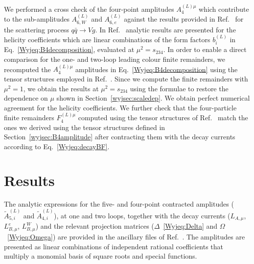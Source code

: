 \documentclass[main.tex]{subfiles}
\begin{document}
We performed a cross check of the four-point amplitudes $A_4^{(L)\mu}$ which contribute to the sub-amplitudes $A^{(L)}_{6,W}$ and $A^{(L)}_{6,e}$ against the results provided in Ref.~\cite{Gehrmann:2011ab} for the scattering process $q\bar{q}\to Vg$. In Ref.~\cite{Gehrmann:2011ab} analytic results are presented 
for the helicity coefficients which are linear combinations of the form factors $b_i^{(L)}$ in Eq.~\eqref{Wyjeq:B4decomposition}, evaluated at $\mu^2 = s_{234}$.
In order to enable a direct comparison for the one- and two-loop leading colour finite remainders, we 
recomputed the $A_4^{(L)\mu}$ amplitudes in Eq.~\eqref{Wyjeq:B4decomposition} using the tensor structures employed in Ref.~\cite{Gehrmann:2011ab}.
Since we compute the finite remainders with $\mu^2=1$, we obtain the results at $\mu^2=s_{234}$ using the formulae to restore the dependence on $\mu$ shown in Section~\ref{wyjsec:scaledep}. We obtain perfect numerical agreement for the helicity coefficients. We further check that the four-particle finite remainders $F_4^{(L)\mu}$ computed using the tensor structures of Ref.~\cite{Gehrmann:2011ab} match the ones we derived using the tensor structures defined in Section~\ref{wyjsec:B4amplitude} after contracting them with the decay currents according to Eq.~\eqref{Wyjeq:decayBF}.
\section{Results}
\label{wyjsec:results}
The analytic expressions for the five- and four-point contracted amplitudes ($\tilde{A}^{(L)}_{5,i}$ and $\tilde{A}^{(L)}_{4,i}$), at one and two loops, together with the decay currents ($L_{A,\mu}$, $L^{e}_{B,\mu}$, $L^{W}_{B,\mu}$) and the relevant projection matrices ($\Delta$~\eqref{Wyjeq:Delta} and $\Omega$~\eqref{Wyjeq:Omega}) are provided in the ancillary files of Ref.~\cite{Badger:2022ncb}. The amplitudes are presented as linear combinations of independent rational coefficients that multiply a monomial basis of square roots and special functions. 
\end{document}
